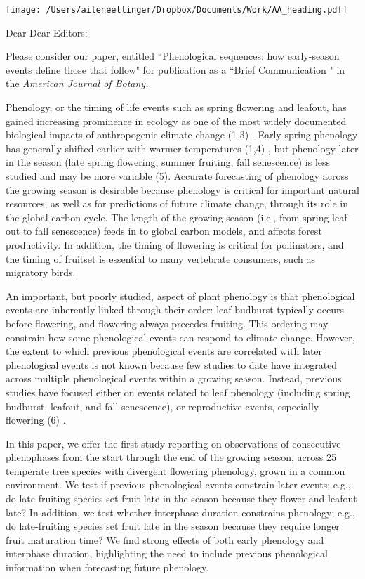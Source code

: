 \documentclass[11pt,a4paper]{letter}
\begin{document}
%

\begin{letter}{}
\texttt{[image: /Users/aileneettinger/Dropbox/Documents/Work/AA\_heading.pdf]}

\opening{Dear Dear Editors:}
Please consider our paper, entitled ``Phenological sequences: how early-season events define those that follow" for publication as a ``Brief Communication " in the \emph{American Journal of Botany.}

Phenology, or the timing of life events such as spring flowering and leafout, has gained increasing prominence in ecology as one of the most widely documented biological impacts of anthropogenic climate change (1-3) . Early spring phenology has generally shifted earlier with warmer temperatures (1,4) , but phenology later in the season (late spring flowering, summer fruiting, fall senescence) is less studied and may be more variable (5).  Accurate forecasting of phenology across the growing season is desirable because phenology is critical for important natural resources, as well as for predictions of future climate change, through its role in the global carbon cycle. The length of the growing season (i.e., from spring leaf-out to fall senescence) feeds in to global carbon models, and affects forest productivity. In addition, the timing of flowering is critical for pollinators, and the timing of fruitset is essential to many vertebrate consumers, such as migratory birds. 

An important, but poorly studied, aspect of plant phenology is that phenological events are inherently linked through their order: leaf budburst typically occurs before flowering, and flowering always precedes fruiting. This ordering may constrain how some phenological events can respond to climate change. However, the extent to which previous phenological events are correlated with later phenological events is not known because few studies to date have integrated across multiple phenological events within a growing season. Instead, previous studies have focused either on events related to leaf phenology (including spring budburst, leafout, and fall senescence), or reproductive events, especially flowering (6) . 


In this paper, we offer the first study reporting on observations of consecutive phenophases from the start through the end of the growing season, across 25 temperate tree species with divergent flowering phenology, grown in a common environment. We test if previous phenological events constrain later events; e.g., do late-fruiting species set fruit late in the season because they flower and leafout late? In addition, we test whether interphase duration constrains phenology; e.g., do late-fruiting species set fruit late in the season because they require longer fruit maturation time? We find strong effects of both early phenology and interphase duration, highlighting the need to include previous phenological information when forecasting future phenology.


\end{letter}
\end{document}
